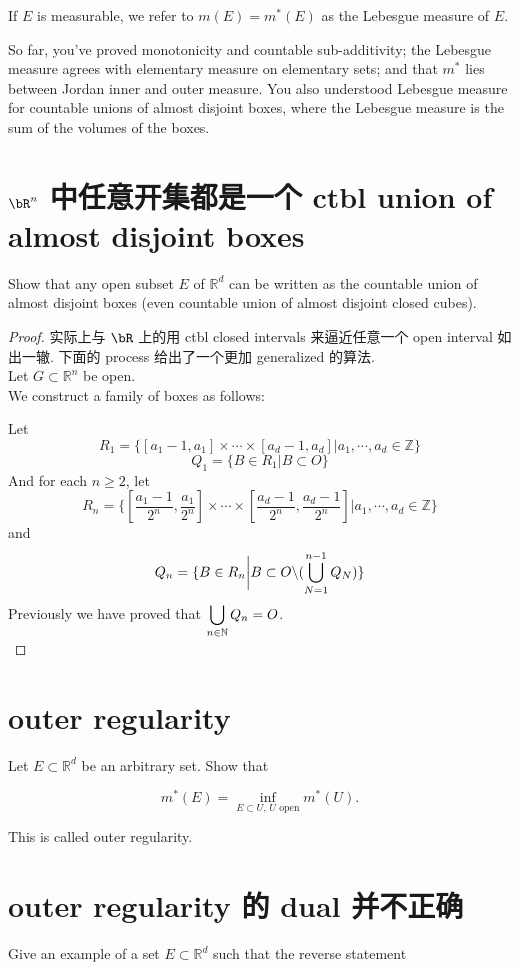 \documentclass[lang=cn,11pt]{template}
\begin{document}
If $E$ is measurable, we refer to $m(E) = m^*(E)$ as the Lebesgue measure of $E$.

So far, you've proved monotonicity and countable sub-additivity; the Lebesgue measure agrees with elementary measure on elementary sets; and that $m^*$ lies between Jordan inner and outer measure. You also understood Lebesgue measure for countable unions of almost disjoint boxes, where the Lebesgue measure is the sum of the volumes of the boxes.

\section{$\bR^n$ 中任意开集都是一个 ctbl union of almost disjoint boxes}

Show that any open subset $E$ of $\mathbb{R}^d$ can be written as the countable union of almost disjoint boxes (even countable union of almost disjoint closed cubes).


\begin{proof}
实际上与 $\bR$ 上的用 ctbl closed intervals 来逼近任意一个 open interval 如出一辙. 下面的 process 给出了一个更加 generalized 的算法.\\
Let $G \subset \mathbb{R}^n$ be open. \\
We construct a family of boxes as follows: 

Let
$$
R_1 = \{ [a_1 - 1, a_1] \times \cdots \times [a_d -1, a_d] \bigg| a_1, \cdots, a_d \in \mathbb{Z} \}
$$
$$
Q_1 = \{B \in R_1 \bigg| B \subset O\}
$$
And for each $n \geq 2$, let
$$
R_n = \{  [\frac{a_1 - 1}{2^n}, \frac{a_1}{2^n}] \times \cdots \times  [\frac{a_d-1}{2^n}, \frac{a_d-1}{2^n}] \bigg| a_1, \cdots, a_d \in \mathbb{Z}\}
$$
and $$
Q_n = \{ B \in R_n \bigg| B \subset O \backslash (\displaystyle\bigcup_{N=1}^{n-1} Q_N) \}
$$
Previously we have proved that $\displaystyle\bigcup_{n \in \mathbb{N}} Q_n = O$.\\
\end{proof}


\section{outer regularity} 
Let $E \subset \mathbb{R}^d$ be an arbitrary set. Show that

\[
m^*(E) = \inf_{E \subset U, \, U \text{ open}} m^*(U).
\]

This is called outer regularity.

\section{outer regularity 的 dual 并不正确} 
Give an example of a set $E \subset \mathbb{R}^d$ such that the reverse statement
\end{document}
